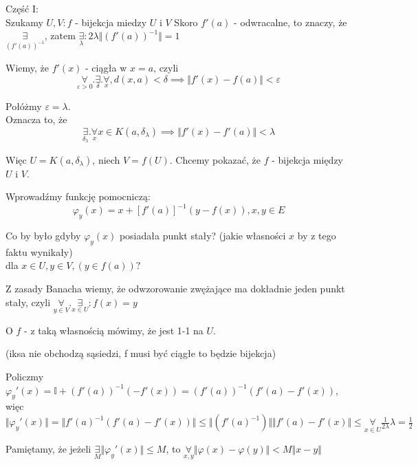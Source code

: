 \documentclass[../main.tex]{subfiles}
\begin{document}
Część I:\\
Szukamy $U,V: f$ - bijekcja miedzy $U$ i $V$
Skoro $f'(a)$ - odwracalne, to znaczy, że $\underset{(f'(a))^{-1}}{\exists}$, zatem $\underset{\lambda}{\exists}: 2\lambda \Vert (f'(a))^{-1} \Vert = 1$

Wiemy, że $f'(x)$ - ciągła w $x=a$, czyli
\begin{equation}
    \underset{\varepsilon>0}{\forall}.\underset{\delta}{\exists}.\underset{x}{\forall},d(x,a)<\delta \implies \Vert f'(x) - f(a) \Vert < \varepsilon
\end{equation}

Połóżmy $\varepsilon = \lambda$.\\
Oznacza to, że \begin{equation}
\underset{\delta_\lambda}{\exists}.\underset{x}{\forall}x\in K(a,\delta_\lambda) \implies \Vert f'(x) - f'(a) \Vert < \lambda
\end{equation}

Więc $U = K(a,\delta_\lambda)$, niech $V = f(U)$. Chcemy pokazać, że $f$ - bijekcja między $U$ i $V$.

Wprowadźmy funkcję pomocniczą:
\begin{equation}
\varphi_y(x) = x+[f'(a)]^{-1} (y-f(x)), x,y\in E
\end{equation}

\begin{pytanie}
    Co by było gdyby $\varphi_y(x)$ posiadała punkt stały? (jakie własności $x$ by z tego faktu wynikały)\\
dla $x\in U, y\in V, (y\in f(a))?$
\end{pytanie}

Z zasady Banacha wiemy, że odwzorowanie zwężające ma dokładnie jeden punkt stały, czyli $\underset{y\in V}{\forall}.\underset{x\in U}{\exists}: f(x) = y$

O $f$ - z taką własnością mówimy, że jest 1-1 na $U$.
\begin{tiny}(iksa nie obchodzą sąsiedzi, f musi być ciągłe to będzie bijekcja)\end{tiny}

Policzmy $\varphi_y '(x) = \mathbb{I} + (f'(a))^{-1} (-f'(x)) = (f'(a))^{-1}(f'(a) - f'(x))$, więc $\Vert \varphi_y '(x) \Vert = \Vert f'(a)^{-1} (f'(a) - f'(x))\Vert \leq \Vert (f'(a)^{-1})\Vert \Vert f'(a) - f'(x) \Vert \leq \underset{x\in U}{\forall}\frac{1}{2\lambda} \lambda = \frac{1}{2}$

Pamiętamy, że jeżeli $\underset{M}{\exists}\Vert\varphi_y '(x)\Vert \leq M$, to $\underset{x,y}{\forall}\Vert \varphi(x) - \varphi(y)\Vert < M\Vert x-y \Vert$
\end{document}
